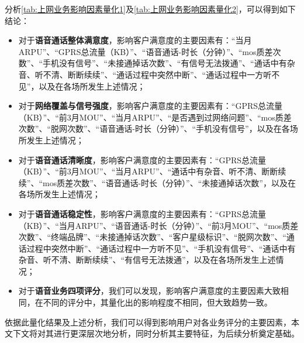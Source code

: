 \documentclass{MathorCupmodeling}
\begin{document}
	{\heiti 分析\textcolor{blue}{\cref{tab:上网业务影响因素量化1}}及\textcolor{blue}{\cref{tab:上网业务影响因素量化2}}，可以得到如下结论：}
	\begin{itemize}
		\item 对于\textbf{语音通话整体满意度}，影响客户满意度的主要因素有：“当月ARPU”、“GPRS总流量（KB）”、“语音通话-时长（分钟）”、“mos质差次数”、“手机没有信号”、“未接通掉话次数”、“有信号无法拨通”、“通话中有杂音、听不清、断断续续”、“通话过程中突然中断”、“通话过程中一方听不见”，以及在各场所发生上述情况；
		\item 对于\textbf{网络覆盖与信号强度}，影响客户满意度的主要因素有：“GPRS总流量（KB）”、“前3月MOU”、“当月ARPU”、“是否遇到过网络问题”、“mos质差次数”、“脱网次数”、“语音通话-时长（分钟）”、“手机没有信号”，以及在各场所发生上述情况；
		\item 对于\textbf{语音通话清晰度}，影响客户满意度的主要因素有：“GPRS总流量（KB）”、“前3月MOU”、“当月ARPU”、“通话中有杂音、听不清、断断续续”、“mos质差次数”、“语音通话-时长（分钟）”、“未接通掉话次数”，以及在各场所发生上述情况；
		\item 对于\textbf{语音通话稳定性}，影响客户满意度的主要因素有：“GPRS总流量（KB）”、“当月ARPU”、“语音通话-时长（分钟）”、“前3月MOU”、“mos质差次数”、“终端品牌”、“未接通掉话次数”、“客户星级标识”、“脱网次数”、“通话过程中突然中断”、“通话过程中一方听不见”、“手机没有信号”、“通话中有杂音、听不清、断断续续”、“有信号无法拨通”，以及在各场所发生上述情况；
		\item 对于\textbf{语音业务四项评分}，我们可以发现，影响客户满意度的主要因素大致相同，在不同的评分中，其量化出的影响程度不相同，但大致趋势一致。
	\end{itemize}

	依据此量化结果及上述分析，我们可以得到影响用户对各业务评分的主要因素，本文下文将对其进行更深层次地分析，同时分析其主要特征，为后续分析奠定基础。
\end{document}
